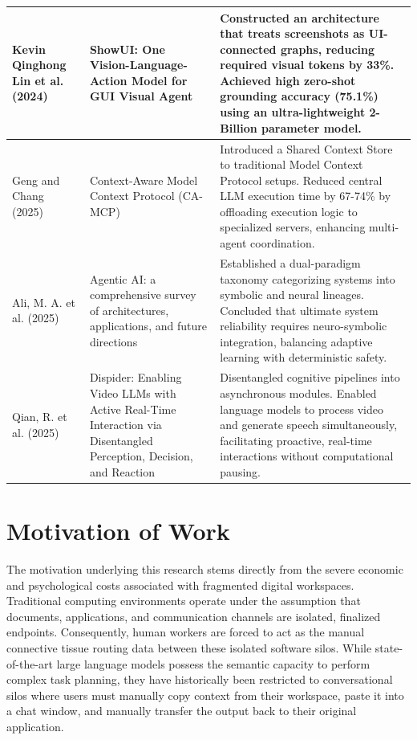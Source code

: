 \documentclass[12pt, a4paper]{report}
\begin{document}
\begin{table}[H]
\begin{tabularx}{\textwidth}{>{\raggedright\arraybackslash}X >{\raggedright\arraybackslash}X >{\raggedright\arraybackslash}X}
    \midrule
    Kevin Qinghong Lin et al. (2024) & ShowUI: One Vision-Language-Action Model for GUI Visual Agent & Constructed an architecture that treats screenshots as UI-connected graphs, reducing required visual tokens by 33\%. Achieved high zero-shot grounding accuracy (75.1\%) using an ultra-lightweight 2-Billion parameter model. \\
    \midrule
    Geng and Chang (2025) & Context-Aware Model Context Protocol (CA-MCP) & Introduced a Shared Context Store to traditional Model Context Protocol setups. Reduced central LLM execution time by 67-74\% by offloading execution logic to specialized servers, enhancing multi-agent coordination. \\
    \midrule
    Ali, M. A. et al. (2025) & Agentic AI: a comprehensive survey of architectures, applications, and future directions & Established a dual-paradigm taxonomy categorizing systems into symbolic and neural lineages. Concluded that ultimate system reliability requires neuro-symbolic integration, balancing adaptive learning with deterministic safety. \\
    \midrule
    Qian, R. et al. (2025) & Dispider: Enabling Video LLMs with Active Real-Time Interaction via Disentangled Perception, Decision, and Reaction & Disentangled cognitive pipelines into asynchronous modules. Enabled language models to process video and generate speech simultaneously, facilitating proactive, real-time interactions without computational pausing. \\
    \bottomrule
    \end{tabularx}
\end{table}

\section{Motivation of Work}
The motivation underlying this research stems directly from the severe economic and psychological costs associated with fragmented digital workspaces. Traditional computing environments operate under the assumption that documents, applications, and communication channels are isolated, finalized endpoints.\cite{microsoft2026} Consequently, human workers are forced to act as the manual connective tissue routing data between these isolated software silos. While state-of-the-art large language models possess the semantic capacity to perform complex task planning, they have historically been restricted to conversational silos where users must manually copy context from their workspace, paste it into a chat window, and manually transfer the output back to their original application.\cite{hojo2025}
\end{document}
